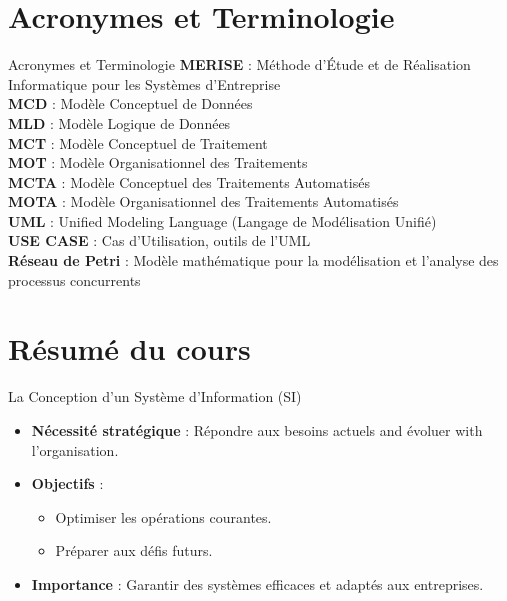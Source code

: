 \documentclass{beamer}
\begin{document}
\section{Acronymes et Terminologie}
\begin{frame}{Acronymes et Terminologie}
    \textbf{MERISE} : Méthode d'Étude et de Réalisation Informatique pour les Systèmes d'Entreprise \\
    \textbf{MCD} : Modèle Conceptuel de Données \\
    \textbf{MLD} : Modèle Logique de Données \\
    \textbf{MCT} : Modèle Conceptuel de Traitement \\
    \textbf{MOT} : Modèle Organisationnel des Traitements \\
    \textbf{MCTA} : Modèle Conceptuel des Traitements Automatisés \\
    \textbf{MOTA} : Modèle Organisationnel des Traitements Automatisés \\
    \textbf{UML} : Unified Modeling Language (Langage de Modélisation Unifié) \\
    \textbf{USE CASE} : Cas d’Utilisation, outils de l'UML \\
    \textbf{Réseau de Petri} : Modèle mathématique pour la modélisation et l’analyse des processus concurrents \\
\end{frame}


\section{Résumé du cours}
\begin{frame}{La Conception d’un Système d’Information (SI)}
    \begin{itemize}
        \item \textbf{Nécessité stratégique} : Répondre aux besoins actuels and évoluer with l'organisation.
        \item \textbf{Objectifs} :
        \begin{itemize}
            \item Optimiser les opérations courantes.
            \item Préparer aux défis futurs.
        \end{itemize}
        \item \textbf{Importance} : Garantir des systèmes efficaces et adaptés aux entreprises.
    \end{itemize}
\end{frame}
\end{document}

